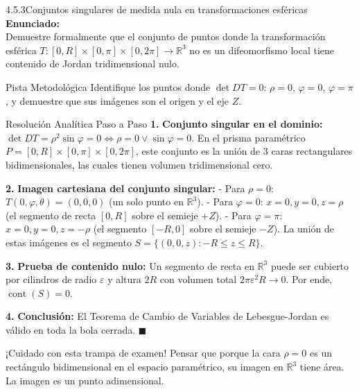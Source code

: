 \documentclass[11pt,a4paper]{article}
\begin{document}
\begin{nivelbox}{4.5.3}{Conjuntos singulares de medida nula en transformaciones esféricas}
\textbf{Enunciado:}\\
Demuestre formalmente que el conjunto de puntos donde la transformación esférica $T: [0,R] \times [0,\pi] \times [0,2\pi] \to \mathbb{R}^3$ no es un difeomorfismo local tiene contenido de Jordan tridimensional nulo.

\begin{observacionbox}{Pista Metodológica}
Identifique los puntos donde $\det DT = 0$: $\rho = 0$, $\varphi = 0$, $\varphi = \pi$, y demuestre que sus imágenes son el origen y el eje $Z$.
\end{observacionbox}

\begin{ejerciciobox}{Resolución Analítica Paso a Paso}
\smallskip\noindent\textbf{1.} \textbf{Conjunto singular en el dominio:}
$\det DT = \rho^2 \sin\varphi = 0 \iff \rho = 0 \lor \sin\varphi = 0$.
En el prisma paramétrico $P = [0,R] \times [0,\pi] \times [0,2\pi]$, este conjunto es la unión de 3 caras rectangulares bidimensionales, las cuales tienen volumen tridimensional cero.

\smallskip\noindent\textbf{2.} \textbf{Imagen cartesiana del conjunto singular:}
- Para $\rho = 0$: $T(0, \varphi, \theta) = (0,0,0)$ (un solo punto en $\mathbb{R}^3$).
- Para $\varphi = 0$: $x = 0, y = 0, z = \rho$ (el segmento de recta $[0, R]$ sobre el semieje $+Z$).
- Para $\varphi = \pi$: $x = 0, y = 0, z = -\rho$ (el segmento $[-R, 0]$ sobre el semieje $-Z$).
La unión de estas imágenes es el segmento $S = \{ (0,0,z) : -R \le z \le R \}$.

\smallskip\noindent\textbf{3.} \textbf{Prueba de contenido nulo:}
Un segmento de recta en $\mathbb{R}^3$ puede ser cubierto por cilindros de radio $\varepsilon$ y altura $2R$ con volumen total $2\pi \varepsilon^2 R \to 0$.
Por ende, $\operatorname{cont}(S) = 0$.

\smallskip\noindent\textbf{4.} \textbf{Conclusión:}
El Teorema de Cambio de Variables de Lebesgue-Jordan es válido en toda la bola cerrada. $\blacksquare$
\end{ejerciciobox}

\begin{errorbox}{¡Cuidado con esta trampa de examen!}
Pensar que porque la cara $\rho = 0$ es un rectángulo bidimensional en el espacio paramétrico, su imagen en $\mathbb{R}^3$ tiene área. La imagen es un punto adimensional.
\end{errorbox}
\end{nivelbox}
\bigskip
\end{document}

